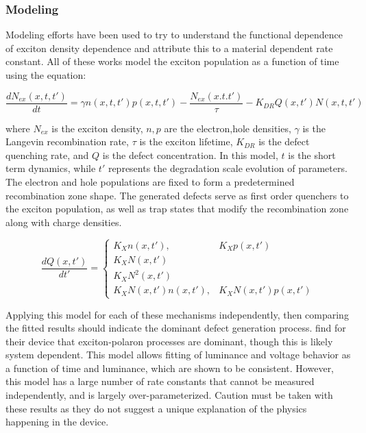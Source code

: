 \documentclass[../thesis.tex]{subfiles}
\begin{document}
\subsubsection{Modeling}

Modeling efforts have been used to try to understand the functional dependence of exciton density dependence and attribute this to a material dependent rate constant.\supercite{Giebink2008a,Coburn2016a,Coburn2017,Peng2017}
All of these works model the exciton population as a function of time using the equation:

\begin{equation}
\frac{dN_{ex}(x,t,t')}{dt}=\gamma n(x,t,t')p(x,t,t')-\frac{N_{ex}(x.t.t')}{\tau}-K_{DR}Q(x,t')N(x,t,t')
\label{eqn:giebink_model_N}
\end{equation}

where $N_{ex}$ is the exciton density, $n,p$ are the electron,hole densities, $\gamma$ is the Langevin recombination rate, $\tau$ is the exciton lifetime, $K_{DR}$ is the defect quenching rate, and $Q$ is the defect concentration.  
In this model, $t$ is the short term dynamics, while $t'$ represents the degradation scale evolution of parameters.
The electron and hole populations are fixed to form a predetermined recombination zone shape.
The generated defects serve as first order quenchers to the exciton population, as well as trap states that modify the recombination zone along with charge densities.

\begin{equation}
\frac{dQ(x,t')}{dt'}=\left\{
\begin{array}{ll} K_X n(x,t'), & K_X p(x,t') \\  
K_XN(x,t') & \\
K_XN^2(x,t') & \\  
K_XN(x,t')n(x,t'), & K_XN(x,t')p(x,t') 
\end{array} \right.
\label{eqn:giebink_model_defects}
\end{equation}

Applying this model for each of these mechanisms independently, then comparing the fitted results should indicate the dominant defect generation process.
\textcite{Giebink2008a} find for their device that exciton-polaron processes are dominant, though this is likely system dependent.
This model allows fitting of luminance and voltage behavior as a function of time and luminance, which are shown to be consistent.
However, this model has a large number of rate constants that cannot be measured independently, and is largely over-parameterized.  
Caution must be taken with these results as they do not suggest a unique explanation of the physics happening in the device.
\end{document}
